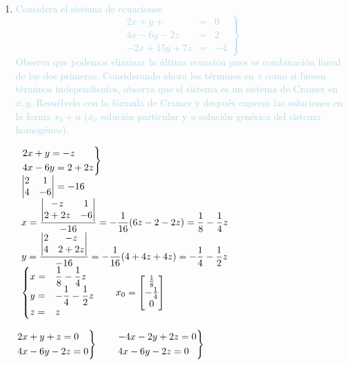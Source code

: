 \begin{enumerate}[label=\color{red}\textbf{\arabic*)},leftmargin=*]
	\item \textcolor{lightblue}{Considera el sistema de ecuaciones \[ \left.\begin{array}{rcr}
			2x+y+&=&0\\
			4x-6y-2z&=&2\\
			-2x+15y+7z&=&-4
		\end{array}\right\} \] Observa que podemos eliminar la última ecuación pues es combinación lineal de las dos primeras. Considerando ahora los términos en $z$ como si fuesen términos independientes, observa que el sistema es un sistema de Cramer en $x,y$. Resuélvelo con la fórmula de Cramer y después expresa las soluciones en la forma $x_0+u$ ($x_0$ solución particular y $u$ solución genérica del sistema homogéneo).}
	
	$\begin{array}{l}
		\begin{rcases}
			2x+y=-z\\
			4x-6y=2+2z
		\end{rcases}\\
		\begin{vmatrix}
			2 & 1\\
			4 & -6
		\end{vmatrix}=-16\\
		x=\dfrac{\begin{vmatrix}
				-z & 1\\
				2+2z & -6\\
		\end{vmatrix}}{-16}=-\dfrac{1}{16}(6z-2-2z)=\dfrac{1}{8}-\dfrac{1}{4}z\\ 
	y=\dfrac{\begin{vmatrix}
			2 & -z\\
			4 & 2+2z
	\end{vmatrix}}{-16}=-\dfrac{1}{16}(4+4z+4z)=-\dfrac{1}{4}-\dfrac{1}{2}z\\
\begin{cases}
	x=&\dfrac{1}{8}-\dfrac{1}{4}z\\
	y=&-\dfrac{1}{4}-\dfrac{1}{2}z\\
	z=&z
\end{cases}\qquad x_0=\begin{bmatrix}
\frac{1}{8}\\
-\frac{1}{4}\\
0
\end{bmatrix}
	\end{array}$
	

$ \begin{rcases}
	2x+y+z=0\\
	4x-6y-2z=0
\end{rcases}\qquad\begin{rcases}
-4x-2y+2z=0\\
4x-6y-2z=0
\end{rcases}$


\end{enumerate}
